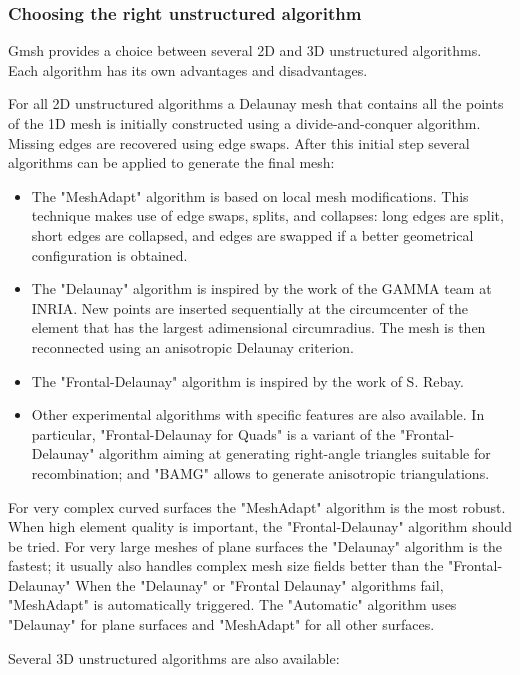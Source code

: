 \documentclass[dvipdfmx, 9pt, a4paper]{article}
\numberwithin{equation}{section}
\begin{document}
\subsubsection{Choosing the right unstructured algorithm}
Gmsh provides a choice between several 2D and 3D unstructured algorithms. Each algorithm has its own advantages and disadvantages.\par
For all 2D unstructured algorithms a Delaunay mesh that contains all the points of the 1D mesh is initially constructed using a divide-and-conquer algorithm. Missing edges are recovered using edge swaps. After this initial step several algorithms can be applied to generate the final mesh:
\begin{itemize}
\item The "MeshAdapt" algorithm is based on local mesh modifications. This technique makes use of edge swaps, splits, and collapses: long edges are split, short edges are collapsed, and edges are swapped if a better geometrical configuration is obtained.
\item The "Delaunay" algorithm is inspired by the work of the GAMMA team at INRIA. New points are inserted sequentially at the circumcenter of the element that has the largest adimensional circumradius. The mesh is then reconnected using an anisotropic Delaunay
criterion.
\item The "Frontal-Delaunay" algorithm is inspired by the work of S. Rebay.
\item Other experimental algorithms with specific features are also available. In particular, "Frontal-Delaunay for Quads" is a variant of the "Frontal-Delaunay" algorithm aiming at generating right-angle triangles suitable for recombination; and "BAMG" allows to generate anisotropic triangulations.
\end{itemize}
For very complex curved surfaces the "MeshAdapt" algorithm is the most robust. When high element quality is important, the "Frontal-Delaunay" algorithm should be tried. For very large meshes of plane surfaces the "Delaunay" algorithm is the fastest; it usually also handles complex mesh size fields better than the "Frontal-Delaunay"  When the "Delaunay" or "Frontal Delaunay" algorithms fail, "MeshAdapt" is automatically triggered. The "Automatic" algorithm uses "Delaunay" for plane surfaces and "MeshAdapt" for all other surfaces.\par
Several 3D unstructured algorithms are also available:
\end{document}
